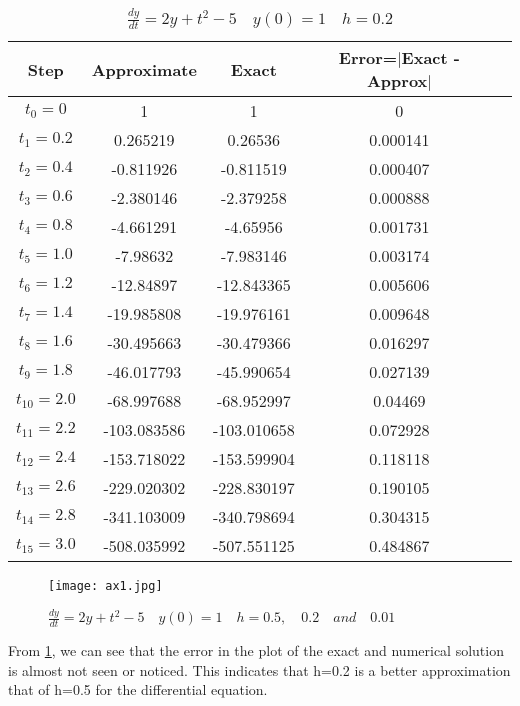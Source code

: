 \documentclass[12pt,a4paper]{article}
\begin{document}
\begin{table}[ht]\caption{$\frac{dy}{dt} = 2y + t^2 - 5  \quad y(0)=1 \quad h=0.2$}
\begin{center}
\begin{tabular}{|c|c|c|c|c|}
\hline
Step  &  Approximate  & Exact & Error=$|$Exact - Approx$|$ \\
\hline
$t_0 = 0 $	& 1	& 1 &	0 \\
\hline
$t_1 = 0.2 $ & 0.265219 & 0.26536 & 0.000141 \\
\hline
$t_2 = 0.4 $ & -0.811926	& -0.811519	& 0.000407 \\
\hline
$t_3 = 0.6 $	& -2.380146 &	-2.379258 &	0.000888 \\
\hline
$t_4 = 0.8 $	& -4.661291	& -4.65956 &	0.001731 \\
\hline
$t_5 = 1.0 $ & -7.98632	& -7.983146	& 0.003174 \\
\hline
$t_6 = 1.2 $ 	& -12.84897	& -12.843365 &	0.005606 \\
\hline
$t_7 = 1.4 $ & -19.985808	& -19.976161	& 0.009648\\
\hline
$t_8 = 1.6 $ & -30.495663 & -30.479366 & 	0.016297\\
\hline
$t_9 = 1.8 $ & -46.017793 & -45.990654	& 0.027139\\
\hline
$t_{10} = 2.0 $ & -68.997688 & -68.952997 & 0.04469 \\
\hline
$t_{11} = 2.2 $	& -103.083586 & -103.010658	& 0.072928 \\
\hline
$t_{12} = 2.4 $	& -153.718022 & -153.599904	& 0.118118 \\
\hline
$t_{13} = 2.6 $	& -229.020302 &	-228.830197	& 0.190105 \\
\hline
$t_{14} = 2.8 $	& -341.103009 & -340.798694 &	0.304315 \\
\hline
$t_{15} = 3.0 $	& -508.035992 & -507.551125	 & 0.484867 \\
\hline
\end{tabular}
\end{center}
\end{table}

\begin{figure}[h]
  \begin{center}
  \texttt{[image: ax1.jpg]}
  \end{center}
  \caption{$\frac{dy}{dt} = 2y + t^2 - 5 \quad y(0)= 1 \quad h = 0.5, \quad 0.2 \quad and \quad 0.01 $}
  \label{fig:1.2}
\end{figure}
From \ref{fig:1.2}, we can see that the error in the plot of the exact and numerical solution is almost not seen or noticed. This indicates that h=0.2 is a better approximation that of h=0.5 for the differential equation.
\end{document}
